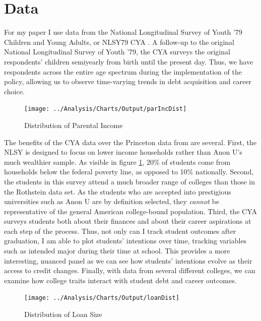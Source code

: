 \documentclass{article}
\begin{document}
	\section{Data}
	
	For my paper I use data from the National Longitudinal Survey of Youth '79 Children and Young Adults, or NLSY79 CYA \parencite{bls2018}. A follow-up to the original National Longitudinal Survey of Youth '79, the CYA surveys the original respondents' children semiyearly from birth until the present day. Thus, we have respondents across the entire age spectrum during the implementation of the policy, allowing us to observe time-varying trends in debt acquisition and career choice. 
	
	\begin{figure}
		\centering
		\caption{Distribution of Parental Income}
		\label{incDist}
		\texttt{[image: ../Analysis/Charts/Output/parIncDist]}
	\end{figure}
	
	The benefits of the CYA data over the Princeton data from \textcite{rothstein2011} are several. First, the NLSY is designed to focus on lower income households rather than Anon U's much wealthier sample. As visible in figure \ref{incDist}, 20\% of students come from households below the federal poverty line, as opposed to 10\% nationally. Second, the students in this survey attend a much broader range of colleges than those in the Rothstein data set. As the students who are accepted into prestigious universities such as Anon U are by definition selected, they \emph{cannot} be representative of the general American college-bound population. Third, the CYA surveys students both about their finances and about their career aspirations at each step of the process. Thus, not only can I track student outcomes after graduation, I am able to plot students' intentions over time, tracking variables such as intended major during their time at school. This provides a more interesting, nuanced panel as we can see how students' intentions evolve as their access to credit changes. Finally, with data from several different colleges, we can examine how college traits interact with student debt and career outcomes. 
	
	\begin{figure}
		\centering
		\caption{Distribution of Loan Size}
		\label{loanDist}
		\texttt{[image: ../Analysis/Charts/Output/loanDist]}
	\end{figure}
	
\end{document}
